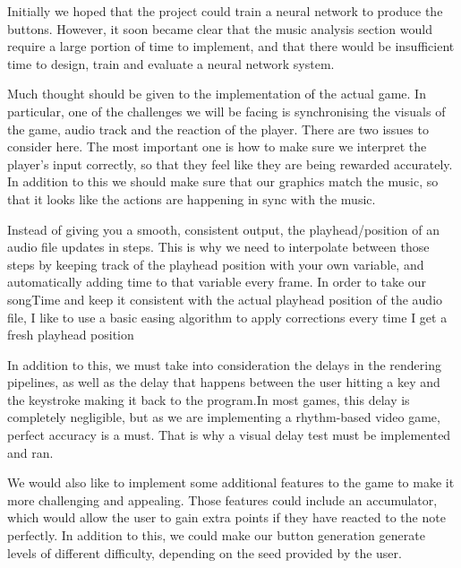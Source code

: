 Initially we hoped that the project could train a neural network to produce the buttons. However, it soon became clear that the music analysis section would require a large portion of time to implement, and that there would be insufficient time to design, train and evaluate a neural network system.

Much thought should be given to the implementation of the actual game. In particular, one of the challenges we will be facing is synchronising the visuals of the game, audio track and the reaction of the player. There are two issues to consider here. The most important one is how to make sure we interpret the player's input correctly, so that they feel like they are being rewarded accurately. In addition to this we should make sure that our graphics match the music, so that it looks like the actions are happening in sync with the music.

Instead of giving you a smooth, consistent output, the playhead/position of an audio file updates in steps. This is why we need to interpolate between those steps by keeping track of the playhead position with your own variable, and automatically adding time to that variable every frame. 
In order to take our songTime and keep it consistent with the actual playhead position of the audio file, I like to use a basic easing algorithm to apply corrections every time I get a fresh playhead position

In addition to this, we must take into consideration the delays in the rendering pipelines, as well as the delay that happens between the user hitting a key and the keystroke making it back to the program.In most games, this delay is completely negligible, but as we are implementing a rhythm-based video game, perfect accuracy is a must. That is why a visual delay test must be implemented and ran. 

We would also like to implement some additional features to the game to make it more challenging and appealing. Those features could include an accumulator, which would allow the user to gain extra points if they have reacted to the note perfectly. In addition to this, we could make our button generation generate levels of different difficulty, depending on the seed provided by the user. 

